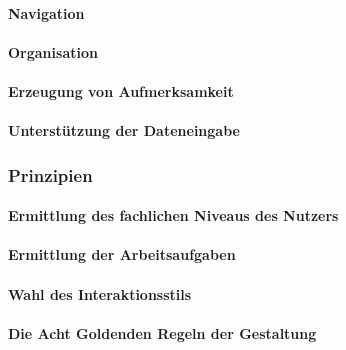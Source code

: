                 \paragraph{Navigation} %

                \paragraph{Organisation} %

                \paragraph{Erzeugung von Aufmerksamkeit} %

                \paragraph{Unterstützung der Dateneingabe} %

            \subsubsection{Prinzipien} %

                \paragraph{Ermittlung des fachlichen Niveaus des Nutzers} %

                \paragraph{Ermittlung der Arbeitsaufgaben} %

                \paragraph{Wahl des Interaktionsstils} %

                \paragraph{Die Acht Goldenden Regeln der Gestaltung} %

